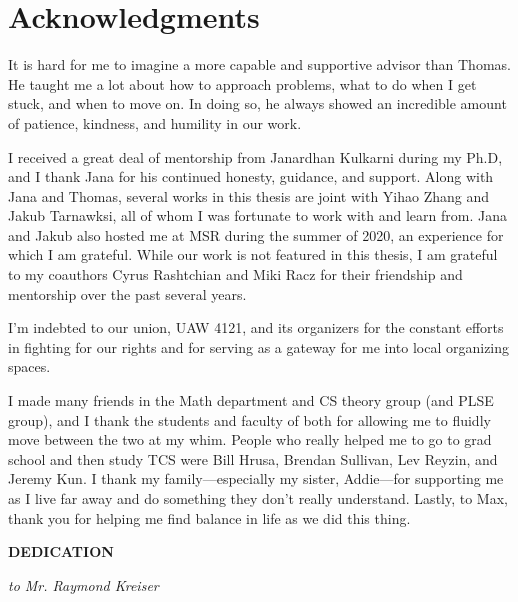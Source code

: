 \documentclass[12pt]{book}
\theoremstyle{theorem}
\theoremstyle{remark}
\theoremstyle{definition}
\theoremstyle{plain}
\theoremstyle{plain}
\theoremstyle{plain}
\theoremstyle{definition}
\theoremstyle{theorem}
\begin{document}
\begin{spacing}{1.5}
  \tableofcontents
\end{spacing}

\chapter*{Acknowledgments}

It is hard for me to imagine a more capable and supportive advisor than Thomas. 
He taught me a lot about how to approach problems, what to do when I get stuck, and when to move on.
In doing so, he always showed an incredible amount of patience, kindness, and humility in our work. 

I received a great deal of mentorship from Janardhan Kulkarni during my Ph.D, and I thank Jana for his continued 
honesty, guidance, and support.
Along with Jana and Thomas, several works in this thesis are joint with Yihao Zhang and Jakub Tarnawksi, all of whom I was fortunate to work with and learn from.
Jana and Jakub also hosted me at MSR during the summer of 2020, an experience for which I am grateful.
While our work is not featured in this thesis, I am grateful to my coauthors Cyrus Rashtchian and Miki Racz 
for their friendship and mentorship over the past several years.

I'm indebted to our union, UAW 4121, and its organizers for the constant efforts in fighting for our rights 
and for serving as a gateway for me into local organizing spaces.


I made many friends in the Math department and CS theory group (and PLSE group), and I thank the students and faculty of both 
for allowing me to fluidly move between the two at my whim. 
People who really helped me to go to grad school and then study TCS were
Bill Hrusa, Brendan Sullivan, Lev Reyzin, and Jeremy Kun.
I thank my family---especially my sister, Addie---for supporting me as I live far away and do something they don't really understand.
Lastly, to Max, thank you for helping me find balance in life as we did this thing.


\begin{center}
    \textbf{DEDICATION}


\emph{to Mr. Raymond Kreiser}


\end{center}




\clearpage

\pagestyle{headings}
\setcounter{page}{1}
\renewcommand{\chaptermark}[1]{\markboth{\sc{\chaptername\ \thechapter.\ #1}}{}}
\renewcommand{\sectionmark}[1]{\markright{\sc{\thesection.\ #1}}{}}





\clearpage
{}
\singlespacing


\end{document}
